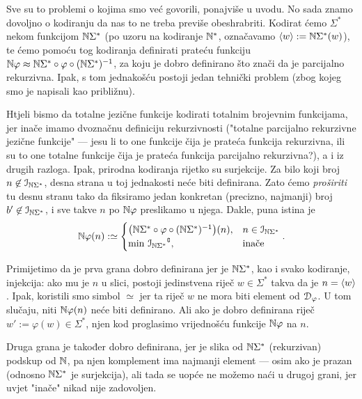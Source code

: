 Sve su to problemi o kojima smo već govorili, ponajviše u uvodu. No sada znamo dovoljno o kodiranju da nas to ne treba previše obeshrabriti. Kodirat ćemo $\Sigma^*$ nekom funkcijom ${\mathbb N}\Sigma^*$ (po uzoru na kodiranje ${\mathbb N}^*$, označavamo $\langle w\rangle:={\mathbb N}\Sigma^*(w)$), te ćemo pomoću tog kodiranja definirati prateću funkciju ${\mathbb N}\varphi\approx{\mathbb N}\Sigma^*\circ\varphi\circ({\mathbb N}\Sigma^*)^{-1}$, za koju je dobro definirano što znači da je parcijalno rekurzivna. Ipak, s tom jednakošću postoji jedan tehnički problem (zbog kojeg smo je napisali kao približnu).

Htjeli bismo da totalne jezične funkcije kodirati totalnim brojevnim funkcijama, jer inače imamo dvoznačnu definiciju rekurzivnosti ("totalne parcijalno rekurzivne jezične funkcije" --- jesu li to one funkcije čija je prateća funkcija rekurzivna, ili su to one totalne funkcije čija je prateća funkcija parcijalno rekurzivna?), a i iz drugih razloga. Ipak, prirodna kodiranja rijetko su surjekcije. Za bilo koji broj $n\not\in\mathcal I_{{\mathbb N}\Sigma^*}$, desna strana u toj jednakosti neće biti definirana. Zato ćemo \emph{proširiti} tu desnu stranu tako da fiksiramo jedan konkretan (precizno, najmanji) broj $b'\not\in\mathcal I_{{\mathbb N}\Sigma^*}$, i sve takve $n$ po ${\mathbb N}\varphi$ preslikamo u njega. Dakle, puna istina je
\begin{equation}\label{eq:Nfidef}
    {\mathbb N}\varphi(n):\simeq\begin{cases}
    \bigl({\mathbb N}\Sigma^*\circ\varphi\circ({\mathbb N}\Sigma^*)^{-1}\bigr)(n),&n\in\mathcal I_{{\mathbb N}\Sigma^*}\\
    \min\,{\mathcal I_{{\mathbb N}\Sigma^*}}\sp{{\scriptscriptstyle\complement}},&\text{inače}
    \end{cases}\text.
\end{equation}

Primijetimo da je prva grana dobro definirana jer je ${\mathbb N}\Sigma^*$, kao i svako kodiranje, injekcija: ako mu je $n$ u slici, postoji jedinstvena riječ $w\in\Sigma^*$ takva da je $n=\langle w\rangle$. Ipak, koristili smo simbol $\simeq$ jer ta riječ $w$ ne mora biti element od $\mathcal D_{\varphi}$. U tom slučaju, niti ${\mathbb N}\varphi(n)$ neće biti definirano. Ali ako je dobro definirana riječ $w':=\varphi(w)\in\Sigma^*$, njen kod proglasimo vrijednošću funkcije ${\mathbb N}\varphi$ na $n$.

Druga grana je također dobro definirana, jer je slika od ${\mathbb N}\Sigma^*$ (rekurzivan) podskup od ${\mathbb N}$, pa njen komplement ima najmanji element --- osim ako je prazan (odnosno ${\mathbb N}\Sigma^*$ je surjekcija), ali tada se uopće ne možemo naći u drugoj grani, jer uvjet "inače" nikad nije zadovoljen.

